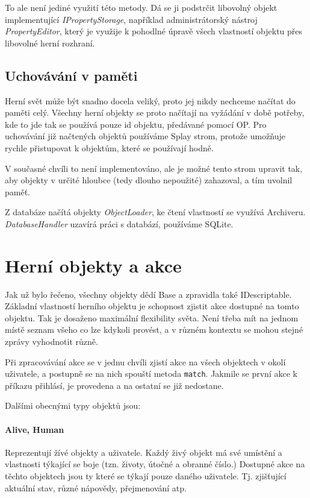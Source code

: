 \documentclass[11pt, a4paper]{article}
\def\class#1{\emph{#1}}
\begin{document}
To ale není jediné využití této metody. Dá se ji podstrčit libovolný objekt implementující \class{IPropertyStorage}, například administrátorský nástroj \class{PropertyEditor}, který je využije k pohodlné úpravě všech vlastností objektu přes libovolné herní rozhraní.

\subsection{Uchovávání v paměti}

Herní svět může být snadno docela veliký, proto jej nikdy nechceme načítat do paměti celý. Všechny herní objekty se proto načítají na vyžádání v době potřeby, kde to jde tak se používá pouze id objektu, předávané pomocí OP. Pro uchovávání již načtených objektů používáme Splay strom, protože umožňuje rychle přistupovat k objektům, které se používají hodně.

V současné chvíli to není implementováno, ale je možné tento strom upravit tak, aby objekty v určité hloubce (tedy dlouho nepoužité) zahazoval, a tím uvolnil paměť.

Z databáze načítá objekty \class{ObjectLoader}, ke čtení vlastností se využívá Archiveru. \class{DatabaseHandler} uzavírá práci s databází, používáme SQLite.

\section{Herní objekty a akce}

Jak už bylo řečeno, všechny objekty dědí Base a zpravidla také IDescriptable. Základní vlastností herního objektu je schopnost zjistit akce dostupné na tomto objektu. Tak je dosaženo maximální flexibility světa. Není třeba mít na jednom místě seznam všeho co lze kdykoli provést, a v různém kontextu se mohou stejné zprávy vyhodnotit různě. 

Při zpracovávání akce se v jednu chvíli zjistí akce na všech objektech v okolí uživatele, a postupně se na nich spouští metoda \texttt{match}. Jakmile se první akce k příkazu přihlásí, je provedena a na ostatní se již nedostane.

Dalšími obecnými typy objektů jsou:

\paragraph{Alive, Human} Reprezentují žívé objekty a uživatele. Každý živý objekt má své umístění a vlastnosti týkající se boje (tzn. životy, útočné a obranné číslo.) Dostupné akce na těchto objektech jsou ty které se týkají pouze daného uživatele. Tj. zjišťující aktuální stav, různé nápovědy, přejmenování atp.
\end{document}
